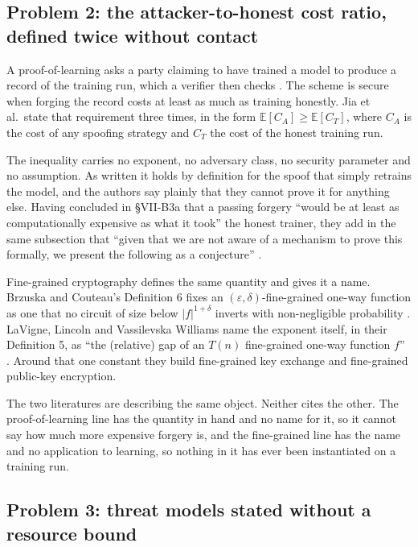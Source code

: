 \subsection{Problem 2: the attacker-to-honest cost ratio, defined twice without contact}
\label{sec:problem-two}

A proof-of-learning asks a party claiming to have trained a model to produce a
record of the training run, which a verifier then checks \cite{JYCDTCP21}. The
scheme is secure when forging the record costs at least as much as training
honestly. Jia et al.\ state that requirement three times, in the form
$\mathbb{E}[C_A] \geq \mathbb{E}[C_T]$, where $C_A$ is the cost of any spoofing
strategy and $C_T$ the cost of the honest training run.

The inequality carries no exponent, no adversary class, no security parameter and
no assumption. As written it holds by definition for the spoof that simply retrains the
model, and the authors say plainly that they cannot prove it for anything else.
Having concluded in \S VII-B3a that a passing forgery ``would be at least as
computationally expensive as what it took'' the honest trainer, they add in the same
subsection that ``given that we are not aware of a mechanism to prove this formally, we
present the following as a conjecture'' \cite{JYCDTCP21}.

Fine-grained cryptography defines the same quantity and gives it a name. Brzuska
and Couteau's Definition 6 fixes an $(\varepsilon,\delta)$-fine-grained one-way
function as one that no circuit of size below $|f|^{1+\delta}$ inverts with
non-negligible probability \cite{BC22}. LaVigne, Lincoln and Vassilevska Williams
name the exponent itself, in their Definition 5, as ``the (relative) gap of an
$T(n)$ fine-grained one-way function $f$'' \cite{LLW19}. Around that one constant
they build fine-grained key exchange and fine-grained public-key encryption.

The two literatures are describing the same object. Neither cites the other. The
proof-of-learning line has the quantity in hand and no name for it, so it cannot
say how much more expensive forgery is, and the fine-grained line has the name and
no application to learning, so nothing in it has ever been instantiated on a
training run.

\subsection{Problem 3: threat models stated without a resource bound}
\label{sec:problem-three}

